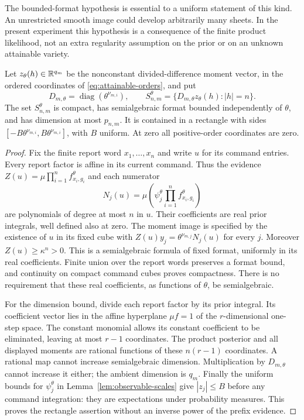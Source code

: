 The bounded-format hypothesis is essential to a uniform statement of
this kind. An unrestricted smooth image could develop arbitrarily many
sheets. In the present experiment this hypothesis is a consequence of
the finite product likelihood, not an extra regularity assumption on the
prior or on an unknown attainable variety.

\begin{lemma}\label{lem:attainable-format}
Let $z_\theta(h)\in\mathbb R^{q_m}$ be the nonconstant divided-difference
moment vector, in the ordered coordinates of
\eqref{eq:attainable-orders}, and put
\[
 D_{m,\theta}=\operatorname{diag}(\theta^{\nu_{m,i}}),\qquad
 S_{n,m}^\theta=\{D_{m,\theta}z_\theta(h):|h|=n\}.
\]
The set $S_{n,m}^\theta$ is compact, has semialgebraic format bounded
independently of $\theta$, and has dimension at most $p_{n,m}$.
It is contained in a rectangle with sides
$[-B\theta^{\nu_{m,i}},B\theta^{\nu_{m,i}}]$, with $B$ uniform.
At zero all positive-order coordinates are zero.
\end{lemma}
\begin{proof}
Fix the finite report word $x_1,\ldots,x_n$ and write $u$ for its
command entries. Every report factor is affine in its current command.
Thus the evidence
$Z(u)=\mu\prod_{i=1}^n f_{x_i,g_i}^\theta$ and each numerator
\[
 N_j(u)=\mu\left(\psi_j^\theta
                   \prod_{i=1}^n f_{x_i,g_i}^\theta\right)
\]
are polynomials of degree at most $n$ in $u$. Their coefficients are
real prior integrals, well defined also at zero. The moment image is
specified by the existence of $u$ in its fixed cube with
$Z(u)y_j=\theta^{\nu_{m,j}}N_j(u)$ for every $j$.
Moreover $Z(u)\ge\kappa^n>0$. This is a semialgebraic formula of
fixed format, uniformly in its real coefficients. Finite union over the
report words preserves a format bound, and continuity on compact command
cubes proves compactness. There is no requirement that these real
coefficients, as functions of $\theta$, be semialgebraic.

For the dimension bound, divide each report factor by its prior
integral. Its coefficient vector lies in the affine hyperplane
$\mu f=1$ of the $r$-dimensional one-step space. The constant monomial
allows its constant coefficient to be eliminated, leaving at most $r-1$
coordinates. The product posterior and all displayed moments are rational
functions of these $n(r-1)$ coordinates. A rational map cannot increase
semialgebraic dimension. Multiplication by $D_{m,\theta}$ cannot increase
it either; the ambient dimension is $q_m$. Finally the uniform bounds
for $\psi_j^\theta$ in Lemma~\ref{lem:observable-scales} give
$|z_j|\le B$ before any command integration: they are expectations under
probability measures. This proves the rectangle assertion without an
inverse power of the prefix evidence.
\end{proof}

